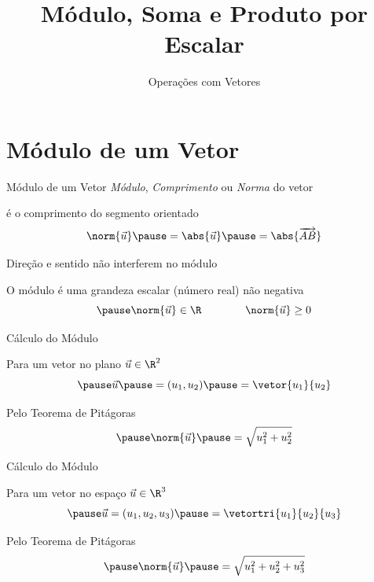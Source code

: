 \documentclass[fleqn,utf8,aspectratio=169,12pt]{beamer}
\title{Módulo, Soma e Produto por Escalar}
\subtitle{Operações com  Vetores}
\begin{document}
\addtitle

\section{Módulo de um Vetor}

\begin{frame}{Módulo de um Vetor}
  \emph{Módulo}, \emph{Comprimento} ou \emph{Norma} do vetor

  \pause
  é o comprimento do segmento orientado
  \pause
  \[
    \norm{\vec{u}}
    \pause
    = \abs{\vec{u}}
    \pause
    = \abs{\overrightarrow{AB}}
  \]

  \pause
  Direção e sentido não interferem no módulo

  \pause
  O módulo é uma grandeza escalar (número real) não negativa
  \[
    \pause
    \norm{\vec{u}} \in \R
    \qquad\qquad
    \norm{\vec{u}} \geq 0
  \]
\end{frame}


\begin{frame}[t]{Cálculo do Módulo}
  \vspace{1\baselineskip}

  Para um vetor no plano $\vec{u} \in \R^2$
  \[
    \pause
    \vec{u}
    \pause
    = ( u_1, u_2 )
    \pause
    = \vetor{u_1}{u_2}
  \]

  \pause
  Pelo Teorema de Pitágoras
  \[
    \pause
    \norm{\vec{u}}
    \pause
    = \sqrt{ u_1^2 + u_2^2 }
  \]
\end{frame}

\begin{frame}[t]{Cálculo do Módulo}
  \vspace{1\baselineskip}

  Para um vetor no espaço $\vec{u} \in \R^3$
  \[
    \pause
    \vec{u}
    = ( u_1, u_2, u_3 )
    \pause
    = \vetortri{u_1}{u_2}{u_3}
  \]

  \pause
  Pelo Teorema de Pitágoras
  \[
    \pause
    \norm{\vec{u}}
    \pause
    = \sqrt{ u_1^2 + u_2^2 + u_3^2 }
  \]
\end{frame}
\end{document}
